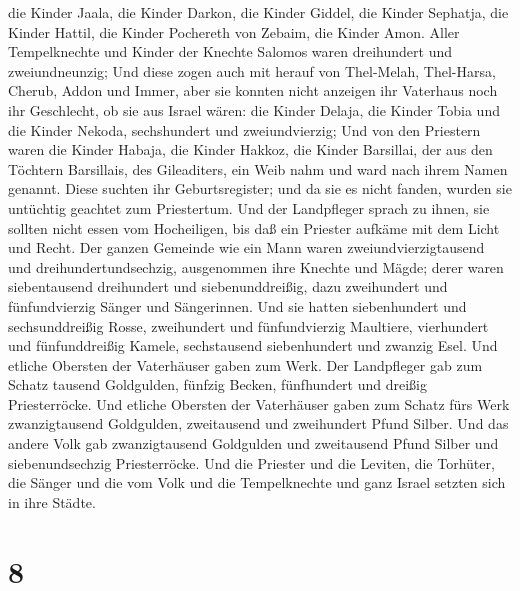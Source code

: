  die Kinder Jaala, die Kinder Darkon, die Kinder Giddel,
 die Kinder Sephatja, die Kinder Hattil, die Kinder
Pochereth von Zebaim, die Kinder Amon.  Aller Tempelknechte
und Kinder der Knechte Salomos waren dreihundert und zweiundneunzig;
 Und diese zogen auch mit herauf von Thel-Melah,
Thel-Harsa, Cherub, Addon und Immer, aber sie konnten nicht anzeigen ihr
Vaterhaus noch ihr Geschlecht, ob sie aus Israel wären: 
die Kinder Delaja, die Kinder Tobia und die Kinder Nekoda, sechshundert
und zweiundvierzig;  Und von den Priestern waren die Kinder
Habaja, die Kinder Hakkoz, die Kinder Barsillai, der aus den Töchtern
Barsillais, des Gileaditers, ein Weib nahm und ward nach ihrem Namen
genannt.  Diese suchten ihr Geburtsregister; und da sie es
nicht fanden, wurden sie untüchtig geachtet zum Priestertum.
 Und der Landpfleger sprach zu ihnen, sie sollten nicht
essen vom Hocheiligen, bis daß ein Priester aufkäme mit dem Licht und
Recht.  Der ganzen Gemeinde wie ein Mann waren
zweiundvierzigtausend und dreihundertundsechzig, 
ausgenommen ihre Knechte und Mägde; derer waren siebentausend
dreihundert und siebenunddreißig, dazu zweihundert und fünfundvierzig
Sänger und Sängerinnen.  Und sie hatten siebenhundert und
sechsunddreißig Rosse, zweihundert und fünfundvierzig Maultiere,
 vierhundert und fünfunddreißig Kamele, sechstausend
siebenhundert und zwanzig Esel.  Und etliche Obersten der
Vaterhäuser gaben zum Werk. Der Landpfleger gab zum Schatz tausend
Goldgulden, fünfzig Becken, fünfhundert und dreißig Priesterröcke.
 Und etliche Obersten der Vaterhäuser gaben zum Schatz fürs
Werk zwanzigtausend Goldgulden, zweitausend und zweihundert Pfund
Silber.  Und das andere Volk gab zwanzigtausend Goldgulden
und zweitausend Pfund Silber und siebenundsechzig Priesterröcke.
 Und die Priester und die Leviten, die Torhüter, die Sänger
und die vom Volk und die Tempelknechte und ganz Israel setzten sich in
ihre Städte.

\hypertarget{section-7}{%
\section{8}\label{section-7}}

